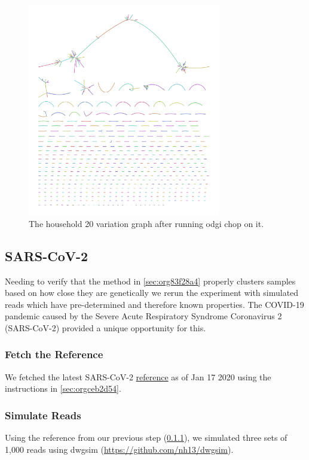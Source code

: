 \documentclass[10pt, a4paper]{article}
\begin{document}
\begin{figure}[h!]
\centering
\includegraphics[width=0.75\textwidth]{../Figures/RSV/Assembly_Bluntified.png}
\caption[RSV Variation Graph]{\label{fig:org1852af0}The household 20 variation graph after running odgi chop on it.}
\end{figure}

\clearpage
\subsection{SARS-CoV-2}
\label{sec:orgc9b0e24}
Needing to verify that the method in \ref{sec:org83f28a4} properly clusters samples based on 
how close they are genetically we rerun the experiment with simulated reads
which have pre-determined and therefore known properties.
The COVID-19 pandemic caused by the Severe Acute Respiratory Syndrome
Coronavirus 2 (SARS-CoV-2) provided a unique opportunity for this. 

\subsubsection{Fetch the Reference}
\label{sec:org1603d36}
We fetched the latest SARS-CoV-2 \href{https://www.ncbi.nlm.nih.gov/nuccore/1798174254}{reference} as of Jan 17 2020 using the instructions
in \ref{sec:orgceb2d54}.

\subsubsection{Simulate Reads}
\label{sec:org3fcaa07}
Using the reference from our previous step (\ref{sec:org1603d36}), we simulated 
three sets of 1,000 reads using dwgsim (\url{https://github.com/nh13/dwgsim}).
\end{document}

